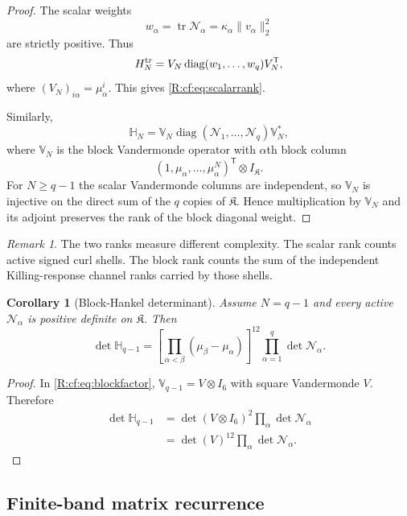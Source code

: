 \documentclass[
 aps,
 prd,
 reprint,
 amsmath,
 amssymb,
 nofootinbib,
 superscriptaddress
]{revtex4-2}
\newtheorem{corollary}[theorem]{Corollary}
\theoremstyle{definition}
\theoremstyle{remark}
\newtheorem{remark}[theorem]{Remark}
\newcommand{\cK}{\mathfrak K}
\newcommand{\cN}{\mathscr N}
\newcommand{\tr}{\operatorname{tr}}
\begin{document}
\begin{proof}
The scalar weights
\[
       w_\alpha
       =
       \tr\cN_\alpha
       =
       \kappa_\alpha\|v_\alpha\|_2^2
\]
are strictly positive.  Thus
\[
 H_N^{\rm tr}
 =
 V_N
 \operatorname{diag}(w_1,\ldots,w_q)
 V_N^\mathsf T,
\]
where $(V_N)_{i\alpha}=\mu_\alpha^i$.  This gives
\eqref{R:cf:eq:scalarrank}.

Similarly,
\begin{equation}
 \mathbb H_N
 =
 \mathbb V_N
 \operatorname{diag}(\cN_1,\ldots,\cN_q)
 \mathbb V_N^*,
 \label{R:cf:eq:blockfactor}
\end{equation}
where $\mathbb V_N$ is the block Vandermonde operator with
$\alpha$th block column
\[
       (1,\mu_\alpha,\ldots,\mu_\alpha^N)^\mathsf T\otimes I_{\cK}.
\]
For $N\ge q-1$ the scalar Vandermonde columns are independent, so
$\mathbb V_N$ is injective on the direct sum of the $q$ copies of $\cK$.
Hence multiplication by $\mathbb V_N$ and its adjoint preserves the rank of
the block diagonal weight.
\end{proof}

\begin{remark}
The two ranks measure different complexity.  The scalar rank counts active
signed curl shells.  The block rank counts the sum of the independent
Killing-response channel ranks carried by those shells.
\end{remark}

\begin{corollary}[Block-Hankel determinant]
\label{R:cf:cor:blockdet}
Assume $N=q-1$ and every active $\cN_\alpha$ is positive definite on
$\cK$.  Then
\begin{equation}
 \boxed{
 \det\mathbb H_{q-1}
 =
 \left[
 \prod_{\alpha<\beta}
 (\mu_\beta-\mu_\alpha)
 \right]^{12}
 \prod_{\alpha=1}^q
 \det\cN_\alpha.
 }
 \label{R:cf:eq:blockdet}
\end{equation}
\end{corollary}

\begin{proof}
In \eqref{R:cf:eq:blockfactor}, $\mathbb V_{q-1}=V\otimes I_6$ with square
Vandermonde $V$.  Therefore
\[
\begin{aligned}
 \det\mathbb H_{q-1}
 &=
 \det(V\otimes I_6)^2
 \prod_\alpha\det\cN_\alpha\\
 &=
 \det(V)^{12}
 \prod_\alpha\det\cN_\alpha.
\end{aligned}
\]
\end{proof}

\subsection{Finite-band matrix recurrence}
\end{document}
